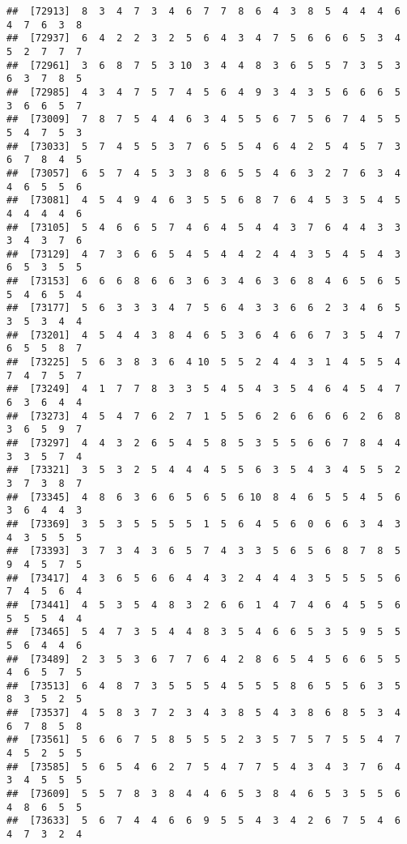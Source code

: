 \documentclass[
]{book}
\begin{document}
\begin{verbatim}
##  [72913]  8  3  4  7  3  4  6  7  7  8  6  4  3  8  5  4  4  4  6  4  7  6  3  8
##  [72937]  6  4  2  2  3  2  5  6  4  3  4  7  5  6  6  6  5  3  4  5  2  7  7  7
##  [72961]  3  6  8  7  5  3 10  3  4  4  8  3  6  5  5  7  3  5  3  6  3  7  8  5
##  [72985]  4  3  4  7  5  7  4  5  6  4  9  3  4  3  5  6  6  6  5  3  6  6  5  7
##  [73009]  7  8  7  5  4  4  6  3  4  5  5  6  7  5  6  7  4  5  5  5  4  7  5  3
##  [73033]  5  7  4  5  5  3  7  6  5  5  4  6  4  2  5  4  5  7  3  6  7  8  4  5
##  [73057]  6  5  7  4  5  3  3  8  6  5  5  4  6  3  2  7  6  3  4  4  6  5  5  6
##  [73081]  4  5  4  9  4  6  3  5  5  6  8  7  6  4  5  3  5  4  5  4  4  4  4  6
##  [73105]  5  4  6  6  5  7  4  6  4  5  4  4  3  7  6  4  4  3  3  3  4  3  7  6
##  [73129]  4  7  3  6  6  5  4  5  4  4  2  4  4  3  5  4  5  4  3  6  5  3  5  5
##  [73153]  6  6  6  8  6  6  3  6  3  4  6  3  6  8  4  6  5  6  5  5  4  6  5  4
##  [73177]  5  6  3  3  3  4  7  5  6  4  3  3  6  6  2  3  4  6  5  3  5  3  4  4
##  [73201]  4  5  4  4  3  8  4  6  5  3  6  4  6  6  7  3  5  4  7  6  5  5  8  7
##  [73225]  5  6  3  8  3  6  4 10  5  5  2  4  4  3  1  4  5  5  4  7  4  7  5  7
##  [73249]  4  1  7  7  8  3  3  5  4  5  4  3  5  4  6  4  5  4  7  6  3  6  4  4
##  [73273]  4  5  4  7  6  2  7  1  5  5  6  2  6  6  6  6  2  6  8  3  6  5  9  7
##  [73297]  4  4  3  2  6  5  4  5  8  5  3  5  5  6  6  7  8  4  4  3  3  5  7  4
##  [73321]  3  5  3  2  5  4  4  4  5  5  6  3  5  4  3  4  5  5  2  3  7  3  8  7
##  [73345]  4  8  6  3  6  6  5  6  5  6 10  8  4  6  5  5  4  5  6  3  6  4  4  3
##  [73369]  3  5  3  5  5  5  5  1  5  6  4  5  6  0  6  6  3  4  3  4  3  5  5  5
##  [73393]  3  7  3  4  3  6  5  7  4  3  3  5  6  5  6  8  7  8  5  9  4  5  7  5
##  [73417]  4  3  6  5  6  6  4  4  3  2  4  4  4  3  5  5  5  5  6  7  4  5  6  4
##  [73441]  4  5  3  5  4  8  3  2  6  6  1  4  7  4  6  4  5  5  6  5  5  5  4  4
##  [73465]  5  4  7  3  5  4  4  8  3  5  4  6  6  5  3  5  9  5  5  5  6  4  4  6
##  [73489]  2  3  5  3  6  7  7  6  4  2  8  6  5  4  5  6  6  5  5  4  6  5  7  5
##  [73513]  6  4  8  7  3  5  5  5  4  5  5  5  8  6  5  5  6  3  5  8  3  5  2  5
##  [73537]  4  5  8  3  7  2  3  4  3  8  5  4  3  8  6  8  5  3  4  6  7  8  5  8
##  [73561]  5  6  6  7  5  8  5  5  5  2  3  5  7  5  7  5  5  4  7  4  5  2  5  5
##  [73585]  5  6  5  4  6  2  7  5  4  7  7  5  4  3  4  3  7  6  4  3  4  5  5  5
##  [73609]  5  5  7  8  3  8  4  4  6  5  3  8  4  6  5  3  5  5  6  4  8  6  5  5
##  [73633]  5  6  7  4  4  6  6  9  5  5  4  3  4  2  6  7  5  4  6  4  7  3  2  4

\end{verbatim}
\end{document}
